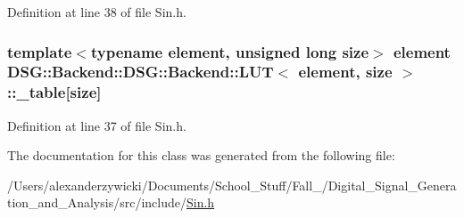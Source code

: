 Definition at line 38 of file Sin.\+h.

\hypertarget{classDSG_1_1Backend_1_1DSG_1_1Backend_1_1LUT_a427da4b7eccdfe25e3c1889a8c2fdea6}{
\subsubsection[{\+\_\+table}]{\setlength{\rightskip}{0pt plus 5cm}template$<$typename element, unsigned long size$>$ element {\bf D\+S\+G\+::\+Backend\+::\+D\+S\+G\+::\+Backend\+::\+L\+U\+T}$<$ element, size $>$\+::\+\_\+table\mbox{[}size\mbox{]}\hspace{0.3cm}{\ttfamily [protected]}}}\label{classDSG_1_1Backend_1_1DSG_1_1Backend_1_1LUT_a427da4b7eccdfe25e3c1889a8c2fdea6}


Definition at line 37 of file Sin.\+h.



The documentation for this class was generated from the following file\+:\begin{DoxyCompactItemize}
\item 
/\+Users/alexanderzywicki/\+Documents/\+School\+\_\+\+Stuff/\+Fall\+\_/\+Digital\+\_\+\+Signal\+\_\+\+Generation\+\_\+and\+\_\+\+Analysis/src/include/\hyperlink{Sin_8h}{Sin.\+h}\end{DoxyCompactItemize}
